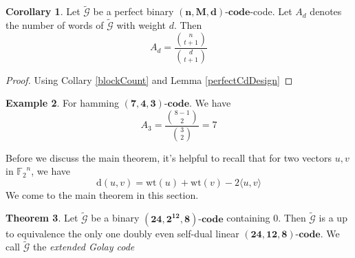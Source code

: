 \documentclass[12pt]{article}
\theoremstyle{definition}
\newtheorem{theorem}{Theorem}[section]
\newtheorem{example}[theorem]{Example}
\newtheorem{collary}[theorem]{Corollary}
\numberwithin{equation}{theorem}
\numberwithin{figure}{theorem}
\newcommand{\cCodes}{\ensuremath{\widetilde{\mathcal{G}}}}
\newcommand{\code}[3]{\ensuremath{\bm{(#1,#2,#3)\mbox{-}code}}}
\newcommand{\linearCode}[3]{\ensuremath{\bm{(#1,#2,#3)\mbox{-}code}}}
\newcommand{\ftwoN}[1]{\ensuremath{\mathbb{F}_2}^{#1}}
\newcommand{\wt}[1]{\ensuremath{\text{wt}(#1)}}
\newcommand{\dist}[2]{\ensuremath{\text{d}(#1,#2)}}
\begin{document}
\begin{collary}\label{perfectCodeAd}
Let {\cCodes} be a perfect binary \code{n}{M}{d}-code. Let $A_d$ denotes the number of words of {\cCodes} with weight $d$. Then
\[
	A_d = \frac{\binom{n}{t+1}}{\binom{d}{t+1}}
\]
\end{collary}
\begin{proof}
	Using Collary \ref{blockCount}  and Lemma \ref{perfectCdDesign}
\end{proof}
\begin{example}
For hamming \linearCode{7}{4}{3}. We have
\[
	A_3 = \frac{\binom{8-1}{2}}{\binom{3}{2}} = 7
\]
\end{example}
Before we discuss the main theorem, it's helpful to recall that for two vectors $u,v$ in $\ftwoN{n}$, we have
\begin{equation}\label{distWeightEqn}
	\dist{u}{v} = \wt{u} + \wt{v} - 2\langle u, v\rangle 
\end{equation}
We come to the main theorem in this section.
\begin{theorem}
Let {\cCodes} be a binary {\code{24}{2^{12}}{8}} containing 0. Then {\cCodes} is a up to equivalence the only one doubly even self-dual linear {\linearCode{24}{12}{8}}. We call {\cCodes} the \emph{extended Golay code}
\end{theorem}
\end{document}
